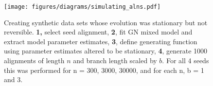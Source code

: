 \begin{figure}[htbp]
\centering
\texttt{[image: figures/diagrams/simulating\_alns.pdf]}
\caption{Creating synthetic data sets whose evolution was stationary but not reversible. \textbf{1,} select seed alignment, \textbf{2}, fit GN mixed model and extract model parameter estimates, \textbf{3}, define generating function using parameter estimates altered to be stationary, \textbf{4}, generate 1000 alignments of length $n$ and branch length scaled by $b$. For all 4 seeds this was performed for n = 300, 3000, 30000, and for each n, b = 1 and 3.}
\label{fig:simulating_alns}
\end{figure}